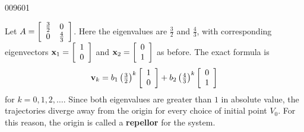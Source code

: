\begin{example}{}{009601}
\begin{wrapfigure}[12]{l}{5cm}
\centering

\end{wrapfigure}
\setlength{\rightskip}{0pt plus 200pt}
Let $ A = \left[ \begin{array}{cc}
\tfrac{3}{2} & 0 \\
0 & \tfrac{4}{3} 
\end{array}\right]$. 
 Here the eigenvalues are $\frac{3}{2}$
 and $\frac{4}{3}$, with corresponding eigenvectors $\textbf{x}_1 = \left[ \begin{array}{r}
1 \\
0
\end{array}\right]$
 and $\textbf{x}_2 = \left[ \begin{array}{r}
0 \\
1
\end{array}\right]$ as before. The exact formula is
\begin{equation*}
\textbf{v}_k  =  b_1 \left( \tfrac{3}{2}\right)^k \left[ \begin{array}{r}
1 \\
0
\end{array}\right] + b_2 \left( \tfrac{4}{3} \right)^k \left[ \begin{array}{r}
0 \\
1
\end{array} \right]
\end{equation*}
for $k = 0, 1, 2, \dots$. Since both eigenvalues are greater than $1$ in 
absolute value, the trajectories diverge away from the origin for every 
choice of initial point $V_{0}$. For this reason, the origin is called a \textbf{repellor} for the system.
\end{example}


